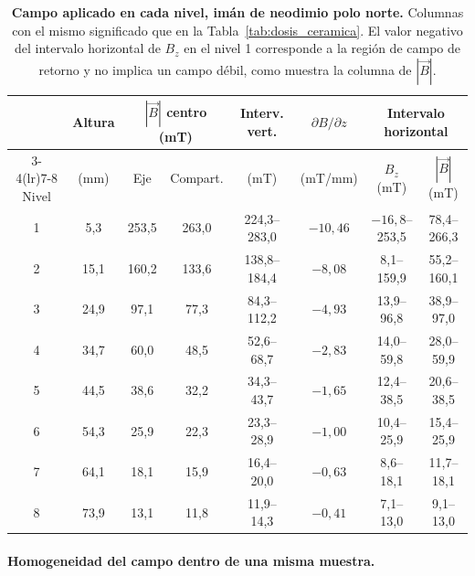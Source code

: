 \begin{table}[tbp]
\small
\setlength{\tabcolsep}{3pt}
    \centering
    \small
    \caption[Campo aplicado en cada nivel, imán de neodimio]{\textbf{Campo aplicado en cada nivel, imán de neodimio polo norte.} Columnas con el mismo significado que en la Tabla~\ref{tab:dosis_ceramica}. El valor negativo del intervalo horizontal de \(B_z\) en el nivel 1 corresponde a la región de campo de retorno y no implica un campo débil, como muestra la columna de \(|\vec{B}|\).}
    \label{tab:dosis_neodimio}
    \begin{tabular}{cccccccc}
        \toprule
        & Altura & \multicolumn{2}{c}{\(|\vec{B}|\) centro (mT)} & Interv. vert. & \(\partial B/\partial z\) & \multicolumn{2}{c}{Intervalo horizontal} \\
        \cmidrule(lr){3-4}\cmidrule(lr){7-8}
        Nivel & (mm) & Eje & Compart. & (mT) & (mT/mm) & \(B_z\) (mT) & \(|\vec{B}|\) (mT) \\
        \midrule
        1 & 5{,}3  & 253{,}5 & 263{,}0 & 224{,}3--283{,}0 & $-10{,}46$ & $-16{,}8$--253{,}5 & 78{,}4--266{,}3 \\
        2 & 15{,}1 & 160{,}2 & 133{,}6 & 138{,}8--184{,}4 & \(-8{,}08\)  & 8{,}1--159{,}9     & 55{,}2--160{,}1 \\
        3 & 24{,}9 & 97{,}1  & 77{,}3  & 84{,}3--112{,}2  & \(-4{,}93\)  & 13{,}9--96{,}8     & 38{,}9--97{,}0 \\
        4 & 34{,}7 & 60{,}0  & 48{,}5  & 52{,}6--68{,}7   & \(-2{,}83\)  & 14{,}0--59{,}8     & 28{,}0--59{,}9 \\
        5 & 44{,}5 & 38{,}6  & 32{,}2  & 34{,}3--43{,}7   & \(-1{,}65\)  & 12{,}4--38{,}5     & 20{,}6--38{,}5 \\
        6 & 54{,}3 & 25{,}9  & 22{,}3  & 23{,}3--28{,}9   & \(-1{,}00\)  & 10{,}4--25{,}9     & 15{,}4--25{,}9 \\
        7 & 64{,}1 & 18{,}1  & 15{,}9  & 16{,}4--20{,}0   & \(-0{,}63\)  & 8{,}6--18{,}1      & 11{,}7--18{,}1 \\
        8 & 73{,}9 & 13{,}1  & 11{,}8  & 11{,}9--14{,}3   & \(-0{,}41\)  & 7{,}1--13{,}0      & 9{,}1--13{,}0 \\
        \bottomrule
    \end{tabular}
\end{table}

\paragraph{Homogeneidad del campo dentro de una misma muestra.}

